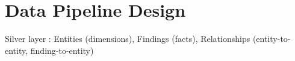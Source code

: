 \chapter{Data Pipeline Design}
\label{ch:pipeline}

Silver layer : Entities (dimensions), Findings (facts), Relationships (entity-to-entity, finding-to-entity)